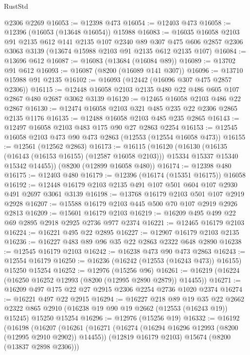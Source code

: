 \begin{lexlean}{RustStd}
\begin{coremodule}
    @2306
    @2269
@16053 := @12398 @473
@16054 := @12403 @473
@16058 := @12396 (@16053 (@13648 @16054)) @15988
@16083 := @16035
    @16058
    @2103
    @91
    @2135
    @612
    @141
    @2135
    @107
    @2340
    @89
    @307
    @475
    @606
    @2857
    @2306
    @3063
    @3139
    (@13674 @15988 @2103 @91 @2135 @612 @2135 @107)
@16084 := @13696 @612
@16087 := @16083 (@13684 (@16084 @89))
@16089 := @13702 @91 @612
@16093 := @16087 (@8200 (@16089 @141 @307))
@16096 := @13710 @15988 @91 @2135
@16102 := @16093 (@12442 (@16096 @307 @475 @2857 @2306))
@16115 := @12448 @16058 @2103 @2135 @480 @22 @486 @605 @107 @2867 @480 @2687 @3062 @3139
@16120 := @12465 @16058 @2103 @486 @22 @2867
@16130 := @12474 @16058 @2103 @321 @485 @235 @22 @2306 @2865 @2135 @1176
@16135 := @12488 @16058 @2103 @485 @235 @2865
@16143 := @12497 @16058 @2103 @483 @175 @90 @27 @2863 @2254
@16153 := @12545 @16058 @2103 @473 @90 @473 @2863 (@12553 (@12554 @16058 @473))
@16155 := @12561 (@12562 @2863)
@16173 := @16115
    (@16120
      (@16130
        (@16135 (@16143 (@16153 @16155) (@12587 @16058 @2103)))
        @15334
        @15337
        @15340
        @15342
        @14455))
    (@8200 (@12899 @16058 @480))
@16174 := @12398 @480
@16175 := @12403 @480
@16179 := @12396 (@16174 (@15351 @16175)) @16058
@16192 := @12448 @16179 @2103 @2135 @491 @107 @501 @604 @107 @2930 @491 @2697 @3061 @3139
@16198 := @13768 @16179 @2103 @501 @107 @2919 @2928
@16207 := @15588 @16179 @2103 @445 @500 @70 @107 @2919 @2926 @2813
@16209 := @15601 @16179 @2103
@16219 := @16209 @495 @499 @22 @69 @2895 @2918 @2925 @2736 @977 @2374
@16221 := @12465 @16179 @2103
@16224 := @16221 @495 @22 @2895
@16227 := @12907 @16179 @2103 @2135
@16236 := @16227 @483 @89 @96 @35 @22 @2863 @2322 @648 @2890
@16238 := @12545 @16179 @2103
@16242 := @16238 @473 @90 @473 @2863
@16243 := @12554 @16179
@16250 := @16236 (@16242 (@12553 (@16243 @473)) @16155) @15250 @15254
@16252 := @12976 (@15256 @96)
@16261 := @16219 (@16224 (@16250 @16252 @12993 (@8200 (@12995 @2890 @2879)) @14455))
@16271 := @16209 @497 @175 @22 @27 @2915 @2306 @2254 @2736 @1020 @2374
@16274 := @16221 @497 @22 @2915
@16294 := @16227
    @218
    @89
    @19
    @35
    @22
    @2662
    @2322
    @865
    @2910
    (@16238 @19 @90 @19 @2662 (@12553 (@16243 @19)) @15245)
    @15250
    @15254
@16296 := @12976 (@15256 @19)
@16332 := @16192
    (@16198
      (@16207
        (@16261
          (@16271
            (@16274 (@16294 @16296 @12993 (@8200 (@12995 @2910 @2902)) @14455))
            (@12819 @16179 @2103)
            @15674
            (@8200 (@13837 @2898 @2306)))

\end{coremodule}
\end{lexlean}
